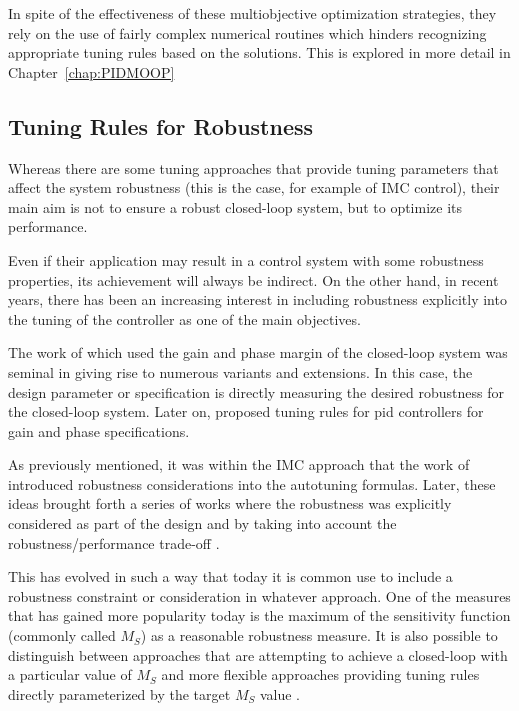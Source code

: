 In spite of the effectiveness of these multiobjective optimization strategies, they rely on the use of fairly complex numerical routines which hinders recognizing appropriate tuning rules based on the solutions. This is explored in more detail in Chapter~\ref{chap:PIDMOOP}
%
\subsection{Tuning Rules for Robustness}
%
Whereas there are some tuning approaches that provide tuning parameters that  affect the system robustness (this is the case, for example of IMC control), their main aim is not to ensure a robust closed-loop system, but to optimize its performance.

Even if their application may result in a control system with some robustness properties, its achievement will always be indirect. On the other hand, in recent years, there has been an increasing interest in including robustness explicitly into the tuning of the controller as one of the main objectives.

The work of \citet{astromhagglun84} which used the gain and phase margin of the closed-loop system was seminal in giving rise to numerous variants and extensions. In this case, the design parameter or specification is directly measuring the desired robustness for the closed-loop system. Later on, \citet{hoetal95} proposed tuning rules for \gls{pid} controllers for gain and phase specifications.

As previously mentioned, it was within the IMC approach that the work of \citet{vilanovaJPC2008} introduced robustness considerations into the autotuning  formulas. Later,  these ideas brought forth a series of works where the robustness was explicitly considered as part of the design and by taking into account the robustness/performance trade-off \citep{alfaroajoc12, alcantara2010, alcantara2013}.

This has evolved in such a way that today it is common use to include a robustness constraint or consideration in whatever approach. One of the measures that has gained more popularity today is the maximum of the sensitivity function (commonly called $M_S$) as a reasonable robustness measure. It is also possible to distinguish between approaches that are attempting to achieve a closed-loop with a particular value of $M_S$ and more flexible approaches providing tuning rules directly parameterized by the target $M_S$ value \citep{arrieta2012, VilanovaBook2012}. 

